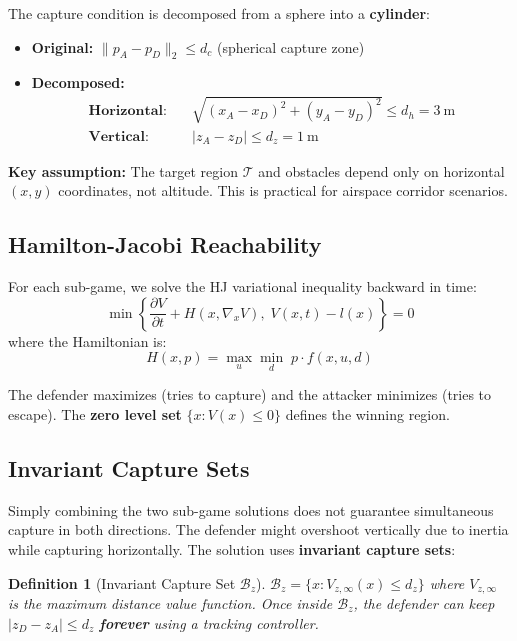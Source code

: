 \documentclass[11pt,a4paper]{article}
\newtheorem{definition}{Definition}
\begin{document}
The capture condition is decomposed from a sphere into a \textbf{cylinder}:

\begin{itemize}
    \item \textbf{Original:} $\|p_A - p_D\|_2 \leq d_c$ \quad (spherical capture zone)
    \item \textbf{Decomposed:}
    \begin{align}
        \textbf{Horizontal:} \quad & \sqrt{(x_A - x_D)^2 + (y_A - y_D)^2} \leq d_h = 3~\text{m} \\
        \textbf{Vertical:} \quad & |z_A - z_D| \leq d_z = 1~\text{m}
    \end{align}
\end{itemize}

\textbf{Key assumption:} The target region $\mathcal{T}$ and obstacles depend only on horizontal $(x,y)$ coordinates, not altitude. This is practical for airspace corridor scenarios.

\subsection{Hamilton-Jacobi Reachability}

For each sub-game, we solve the HJ variational inequality backward in time:
\begin{equation}
\min\left\{\frac{\partial V}{\partial t} + H\left(x, \nabla_x V\right),\; V(x,t) - l(x)\right\} = 0
\label{eq:hji}
\end{equation}
where the Hamiltonian is:
\begin{equation}
H(x, p) = \max_u \min_d \; p \cdot f(x, u, d)
\end{equation}

The defender maximizes (tries to capture) and the attacker minimizes (tries to escape). The \textbf{zero level set} $\{x : V(x) \leq 0\}$ defines the winning region.

\subsection{Invariant Capture Sets}

Simply combining the two sub-game solutions does not guarantee simultaneous capture in both directions. The defender might overshoot vertically due to inertia while capturing horizontally. The solution uses \textbf{invariant capture sets}:

\begin{definition}[Invariant Capture Set $\mathcal{B}_z$]
$\mathcal{B}_z = \{x : V_{z,\infty}(x) \leq d_z\}$ where $V_{z,\infty}$ is the maximum distance value function. Once inside $\mathcal{B}_z$, the defender can keep $|z_D - z_A| \leq d_z$ \textbf{forever} using a tracking controller.
\end{definition}
\end{document}
